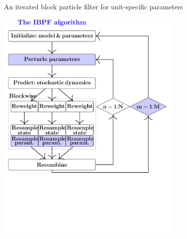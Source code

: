 \documentclass{beamer}
\begin{document}
\begin{frame}{An iterated block particle filter for unit-specific parameters}


  \begin{center}
    
  \includegraphics[trim={0 0 0 10mm},clip,width=9cm]{IBPF_workflow.pdf}


  \end{center}
  
\end{frame}
\end{document}
